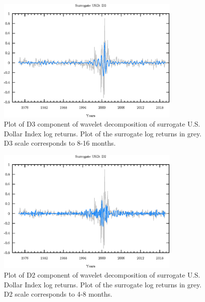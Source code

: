 \begin{figure}
\begin{center}
\includegraphics[width=0.8\textwidth]{./code/plot/surrogate_usd_wr_D3.eps}
\caption{Plot of D3 component of wavelet decomposition of surrogate U.S. Dollar Index log returns. 
	Plot of the surrogate log returns in grey. D3 scale corresponds to 8-16 months.}
\end{center}
\label{fig:s-usd-wr-d3}
\end{figure}

\begin{figure}
\begin{center}
\includegraphics[width=0.8\textwidth]{./code/plot/surrogate_usd_wr_D2.eps}
\caption{Plot of D2 component of wavelet decomposition of surrogate U.S. Dollar Index log returns. 
	Plot of the surrogate log returns in grey. D2 scale corresponds to 4-8 months.}
\end{center}
\label{fig:s-usd-wr-d2}
\end{figure}

